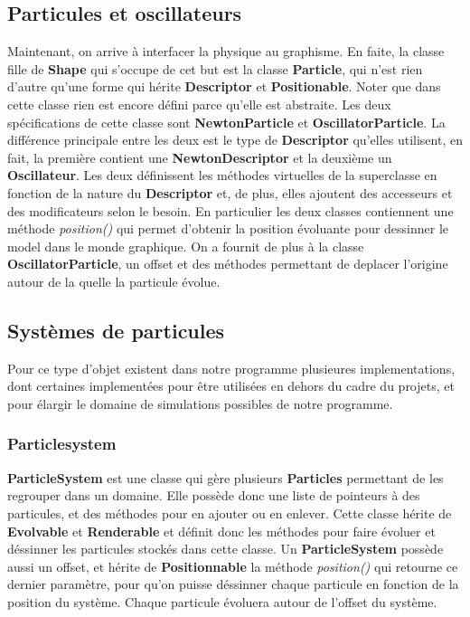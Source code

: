 \documentclass{report}
\begin{document}
\subsection{Particules et oscillateurs}

Maintenant, on arrive à interfacer la physique au graphisme.
En faite, la classe fille de \textbf{Shape} qui s'occupe de cet but est 
la classe \textbf{Particle}, qui n'est rien d'autre qu'une forme 
qui hérite \textbf{Descriptor} et \textbf{Positionable}. Noter que dans 
cette classe rien est encore défini parce qu'elle est abstraite.
Les deux spécifications de cette classe sont \textbf{NewtonParticle} et 
\textbf{OscillatorParticle}. La différence principale entre les deux est 
le type de \textbf{Descriptor} qu'elles utilisent, en fait, la première 
contient une \textbf{NewtonDescriptor} et la deuxième un \textbf{Oscillateur}.
Les deux définissent les méthodes virtuelles de la superclasse en fonction de la
nature du \textbf{Descriptor} et, de plus, elles ajoutent des accesseurs et des 
modificateurs selon le besoin.
En particulier les deux classes contiennent une méthode \textit{position()} qui permet d'obtenir la position évoluante pour dessinner le model dans le monde graphique.
On a fournit de plus à la classe \textbf{OscillatorParticle}, un offset et des méthodes permettant de deplacer l'origine autour de la quelle la particule évolue.

\subsection{Systèmes de particules}

Pour ce type d'objet existent dans notre programme plusieures implementations, dont certaines implementées pour être utilisées en dehors du cadre du projets, et pour élargir le domaine de simulations possibles de notre programme.
 
\subsubsection{Particlesystem}
\textbf{ParticleSystem} est une classe qui gère plusieurs \textbf{Particles} permettant de les regrouper dans un domaine.
Elle possède donc une liste de pointeurs à des particules, et des méthodes pour en ajouter ou en enlever.
Cette classe hérite de \textbf{Evolvable} et \textbf{Renderable} et définit donc les méthodes pour faire évoluer et déssinner les particules stockés dans cette classe.
Un \textbf{ParticleSystem} possède aussi un offset, et hérite de \textbf{Positionnable} la méthode \textit{position()} qui retourne ce dernier paramètre, pour qu'on puisse déssinner
chaque particule en fonction de la position du système. Chaque particule évoluera autour de l'offset du système.
\end{document}
